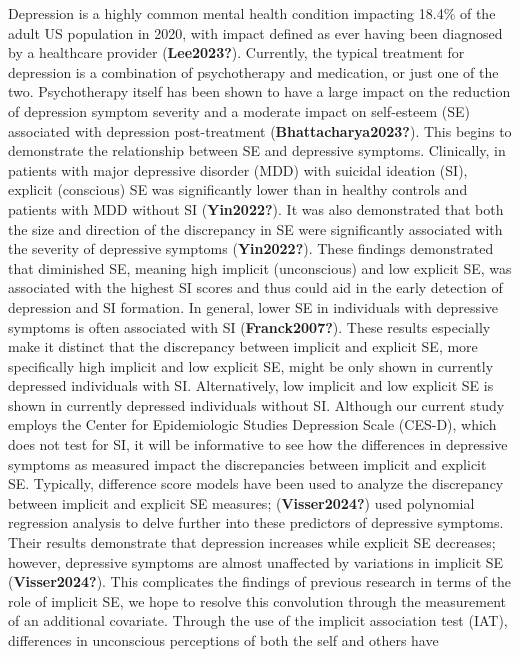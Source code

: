 \documentclass[
]{article}
\begin{document}
Depression is a highly common mental health condition impacting 18.4\%
of the adult US population in 2020, with impact defined as ever having
been diagnosed by a healthcare provider (\textbf{Lee2023?}). Currently,
the typical treatment for depression is a combination of psychotherapy
and medication, or just one of the two. Psychotherapy itself has been
shown to have a large impact on the reduction of depression symptom
severity and a moderate impact on self-esteem (SE) associated with
depression post-treatment (\textbf{Bhattacharya2023?}). This begins to
demonstrate the relationship between SE and depressive symptoms.
Clinically, in patients with major depressive disorder (MDD) with
suicidal ideation (SI), explicit (conscious) SE was significantly lower
than in healthy controls and patients with MDD without SI
(\textbf{Yin2022?}). It was also demonstrated that both the size and
direction of the discrepancy in SE were significantly associated with
the severity of depressive symptoms (\textbf{Yin2022?}). These findings
demonstrated that diminished SE, meaning high implicit (unconscious) and
low explicit SE, was associated with the highest SI scores and thus
could aid in the early detection of depression and SI formation. In
general, lower SE in individuals with depressive symptoms is often
associated with SI (\textbf{Franck2007?}). These results especially make
it distinct that the discrepancy between implicit and explicit SE, more
specifically high implicit and low explicit SE, might be only shown in
currently depressed individuals with SI. Alternatively, low implicit and
low explicit SE is shown in currently depressed individuals without SI.
Although our current study employs the Center for Epidemiologic Studies
Depression Scale (CES-D), which does not test for SI, it will be
informative to see how the differences in depressive symptoms as
measured impact the discrepancies between implicit and explicit SE.
Typically, difference score models have been used to analyze the
discrepancy between implicit and explicit SE measures;
(\textbf{Visser2024?}) used polynomial regression analysis to delve
further into these predictors of depressive symptoms. Their results
demonstrate that depression increases while explicit SE decreases;
however, depressive symptoms are almost unaffected by variations in
implicit SE (\textbf{Visser2024?}). This complicates the findings of
previous research in terms of the role of implicit SE, we hope to
resolve this convolution through the measurement of an additional
covariate. Through the use of the implicit association test (IAT),
differences in unconscious perceptions of both the self and others have
\end{document}
